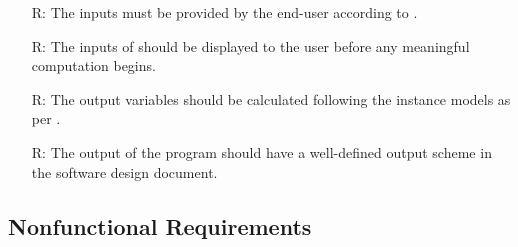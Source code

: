 \documentclass[12pt]{article}
\newcounter{reqnum} %
\begin{document}
\noindent
\begin{itemize}

    \item[R\refstepcounter{reqnum}\thereqnum \label{R_Inputs}:] The inputs must
        be provided by the end-user according to .

    \item[R\refstepcounter{reqnum}\thereqnum \label{R_OutputInputs}:] The inputs
        of \progname{} should be displayed to the user before any meaningful
        computation begins.

    \item[R\refstepcounter{reqnum}\thereqnum \label{R_Calculate}:] The output
        variables should be calculated following the instance models as per
        .

    \item[R\refstepcounter{reqnum}\thereqnum \label{R_Output}:] The output of
        the program should have a well-defined output scheme in the software
        design document.

\end{itemize}

\subsection{Nonfunctional Requirements}
\end{document}

